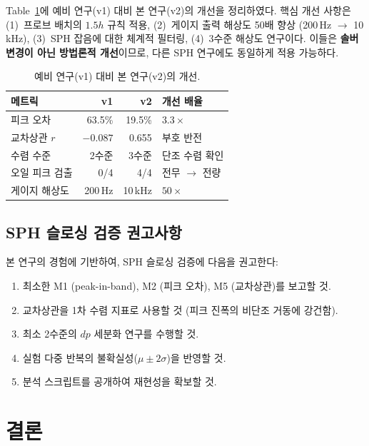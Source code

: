 \documentclass[11pt]{article}
\begin{document}
Table~\ref{tab:v1v2}에 예비 연구(v1) 대비 본 연구(v2)의 개선을 정리하였다.
핵심 개선 사항은 (1)~프로브 배치의 $1.5h$ 규칙 적용,
(2)~게이지 출력 해상도 50배 향상 (200\,Hz $\to$ 10\,kHz),
(3)~SPH 잡음에 대한 체계적 필터링,
(4)~3수준 해상도 연구이다.
이들은 \textbf{솔버 변경이 아닌 방법론적 개선}이므로,
다른 SPH 연구에도 동일하게 적용 가능하다.

\begin{table}[H]
\caption{예비 연구(v1) 대비 본 연구(v2)의 개선.}
\label{tab:v1v2}
\centering
\begin{tabular}{@{}lrrl@{}}
\toprule
메트릭 & v1 & v2 & 개선 배율 \\
\midrule
피크 오차 & 63.5\% & 19.5\% & $3.3\times$ \\
교차상관 $r$ & $-0.087$ & 0.655 & 부호 반전 \\
수렴 수준 & 2수준 & 3수준 & 단조 수렴 확인 \\
오일 피크 검출 & 0/4 & 4/4 & 전무 $\to$ 전량 \\
게이지 해상도 & 200\,Hz & 10\,kHz & $50\times$ \\
\bottomrule
\end{tabular}
\end{table}


\subsection{SPH 슬로싱 검증 권고사항} \label{sec:recommendations}

본 연구의 경험에 기반하여, SPH 슬로싱 검증에 다음을 권고한다:
\begin{enumerate}
    \item 최소한 M1 (peak-in-band), M2 (피크 오차), M5 (교차상관)를 보고할 것.
    \item 교차상관을 1차 수렴 지표로 사용할 것
          (피크 진폭의 비단조 거동에 강건함).
    \item 최소 2수준의 $dp$ 세분화 연구를 수행할 것.
    \item 실험 다중 반복의 불확실성($\mu \pm 2\sigma$)을 반영할 것.
    \item 분석 스크립트를 공개하여 재현성을 확보할 것.
\end{enumerate}


\section{결론} \label{sec:conclusions}
\setcounter{equation}{0}
\end{document}
